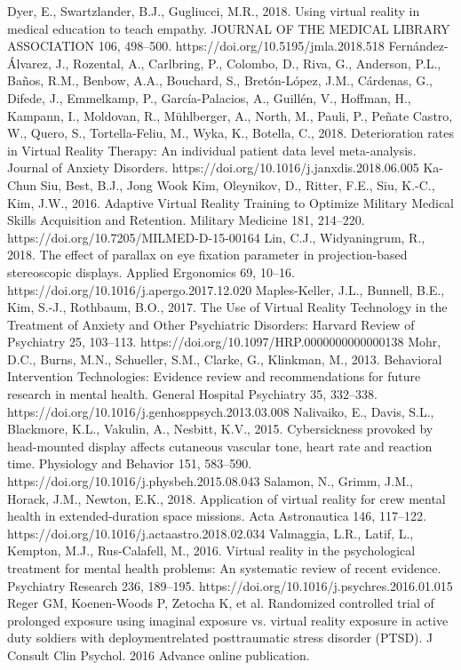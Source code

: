\documentclass[10pt,journal,compsoc]{IEEEtran}
\begin{document}
	\begin{thebibliography}{1}
		
	\bibitem
Dyer, E., Swartzlander, B.J., Gugliucci, M.R., 2018. Using virtual reality in medical education to teach empathy. JOURNAL OF THE MEDICAL LIBRARY ASSOCIATION 106, 498–500. https://doi.org/10.5195/jmla.2018.518
\bibitem
Fernández-Álvarez, J., Rozental, A., Carlbring, P., Colombo, D., Riva, G., Anderson, P.L., Baños, R.M., Benbow, A.A., Bouchard, S., Bretón-López, J.M., Cárdenas, G., Difede, J., Emmelkamp, P., García-Palacios, A., Guillén, V., Hoffman, H., Kampann, I., Moldovan, R., Mühlberger, A., North, M., Pauli, P., Peñate Castro, W., Quero, S., Tortella-Feliu, M., Wyka, K., Botella, C., 2018. Deterioration rates in Virtual Reality Therapy: An individual patient data level meta-analysis. Journal of Anxiety Disorders. https://doi.org/10.1016/j.janxdis.2018.06.005
\bibitem
Ka-Chun Siu, Best, B.J., Jong Wook Kim, Oleynikov, D., Ritter, F.E., Siu, K.-C., Kim, J.W., 2016. Adaptive Virtual Reality Training to Optimize Military Medical Skills Acquisition and Retention. Military Medicine 181, 214–220. https://doi.org/10.7205/MILMED-D-15-00164
\bibitem
Lin, C.J., Widyaningrum, R., 2018. The effect of parallax on eye fixation parameter in projection-based stereoscopic displays. Applied Ergonomics 69, 10–16. https://doi.org/10.1016/j.apergo.2017.12.020
\bibitem
Maples-Keller, J.L., Bunnell, B.E., Kim, S.-J., Rothbaum, B.O., 2017. The Use of Virtual Reality Technology in the Treatment of Anxiety and Other Psychiatric Disorders: Harvard Review of Psychiatry 25, 103–113. https://doi.org/10.1097/HRP.0000000000000138
\bibitem
Mohr, D.C., Burns, M.N., Schueller, S.M., Clarke, G., Klinkman, M., 2013. Behavioral Intervention Technologies: Evidence review and recommendations for future research in mental health. General Hospital Psychiatry 35, 332–338. https://doi.org/10.1016/j.genhosppsych.2013.03.008
\bibitem
Nalivaiko, E., Davis, S.L., Blackmore, K.L., Vakulin, A., Nesbitt, K.V., 2015. Cybersickness provoked by head-mounted display affects cutaneous vascular tone, heart rate and reaction time. Physiology and Behavior 151, 583–590. https://doi.org/10.1016/j.physbeh.2015.08.043
\bibitem
Salamon, N., Grimm, J.M., Horack, J.M., Newton, E.K., 2018. Application of virtual reality for crew mental health in extended-duration space missions. Acta Astronautica 146, 117–122. https://doi.org/10.1016/j.actaastro.2018.02.034
\bibitem
Valmaggia, L.R., Latif, L., Kempton, M.J., Rus-Calafell, M., 2016. Virtual reality in the psychological treatment for mental health problems: An systematic review of recent evidence. Psychiatry Research 236, 189–195. https://doi.org/10.1016/j.psychres.2016.01.015
\bibitem
Reger GM, Koenen-Woods P, Zetocha K, et al. Randomized controlled trial of prolonged exposure using imaginal exposure vs. virtual reality exposure in active duty soldiers with deploymentrelated posttraumatic stress disorder (PTSD). J Consult Clin Psychol. 2016 Advance online publication. 

	\end{thebibliography}
	
\end{document}
